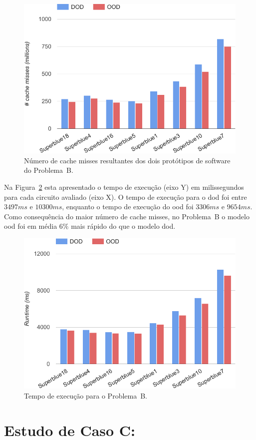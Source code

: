 \begin{figure}[ht]
    \centering
    \includegraphics[width=0.7\linewidth]{img/results/missProblemB}
    \caption[Cache misses do Problema~B.]{Número de cache misses resultantes dos dois protótipos de software do Problema~B.}
    \label{fig:missProblemB}
\end{figure}

Na Figura~\ref{fig:runtimeProblemB} esta apresentado o tempo de execução (eixo Y) em milissegundos para cada circuito avaliado (eixo X). O tempo de execução para o \ac{dod} foi entre $3497ms$ e $10300ms$, enquanto o tempo de execução do \ac{ood} foi $3306ms$ e $9654ms$. Como consequência do maior número de cache misses, no Problema~B o modelo \ac{ood} foi em média $6\%$ mais rápido do que o modelo \ac{dod}.

\begin{figure}[ht]
    \centering
    \includegraphics[width=0.7\linewidth]{img/results/runtimeProblemB}
    \caption[Tempo de execução Problema~B]{Tempo de execução para o Problema~B.}
    \label{fig:runtimeProblemB}
\end{figure}

\section{Estudo de Caso C:}
\label{sec:problema_c}

